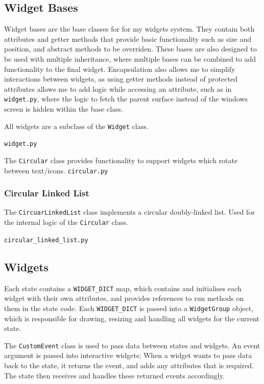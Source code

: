 \documentclass[../main/main.tex]{subfiles}
\begin{document}
\subsection{Widget Bases}
\label{sec:widget-bases}
Widget bases are the base classes for for my widgets system. They contain both attributes and getter methods that provide basic functionality such as size and position, and abstract methods to be overriden. These bases are also designed to be used with multiple inheritance, where multiple bases can be combined to add functionality to the final widget. Encapsulation also allows me to simplify interactions between widgets, as using getter methods instead of protected attributes allows me to add logic while accessing an attribute, such as in \verb|widget.py|, where the logic to fetch the parent surface instead of the windows screen is hidden within the base class.

\bigskip
\noindent All widgets are a subclass of the \lstinline{Widget} class.

\noindent\verb|widget.py|


\bigskip
\noindent The \lstinline{Circular} class provides functionality to support widgets which rotate between text/icons.
\noindent\verb|circular.py|


\subsubsection{Circular Linked List}
\label{sec:linked-list}
The \lstinline{CircuarLinkedList} class implements a circular doubly-linked list. Used for the internal logic of the \lstinline{Circular} class.

\noindent\verb|circular_linked_list.py|


\subsection{Widgets}
\label{sec:widgets}
Each state contains a \lstinline{WIDGET_DICT} map, which contains and initialises each widget with their own attributes, and provides references to run methods on them in the state code. Each \lstinline{WIDGET_DICT} is passed into a \lstinline{WidgetGroup} object, which is responsible for drawing, resizing and handling all widgets for the current state.

The \lstinline{CustomEvent} class is used to pass data between states and widgets. An event argument is passed into interactive widgets; When a widget wants to pass data back to the state, it returns the event, and adds any attributes that is required. The state then receives and handles these returned events accordingly.
\end{document}
